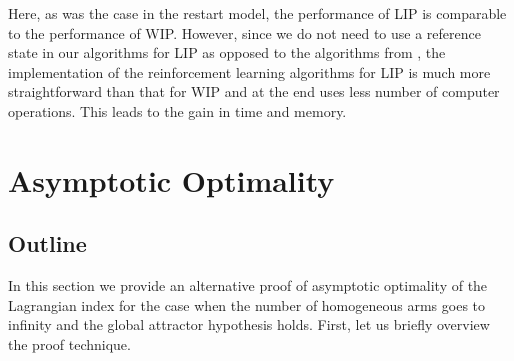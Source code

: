 \documentclass[12pt]{article}
\numberwithin{equation}{section}
\newcommand{\1}{\textbf{1}}
\begin{document}
Here, as was the case in the restart model, the performance of LIP is comparable to the performance of WIP.
However, since we do not need to use a reference state in our algorithms for LIP as opposed to the algorithms
from \cite{Avrachenkov2,Pagare,Robledo1,Robledo2}, the implementation of the reinforcement learning algorithms
for LIP is much more straightforward than that for WIP and at the end uses less number of computer operations.
This leads to the gain in time and memory.


\section{Asymptotic Optimality}
\label{sec:asympt}

\subsection{Outline} In this section we provide an alternative proof of asymptotic optimality of the Lagrangian index
for the case when the number of homogeneous arms goes to infinity and the global attractor hypothesis \cite{Gast,Verloop} holds. First, let us briefly overview the proof technique. 
\end{document}
